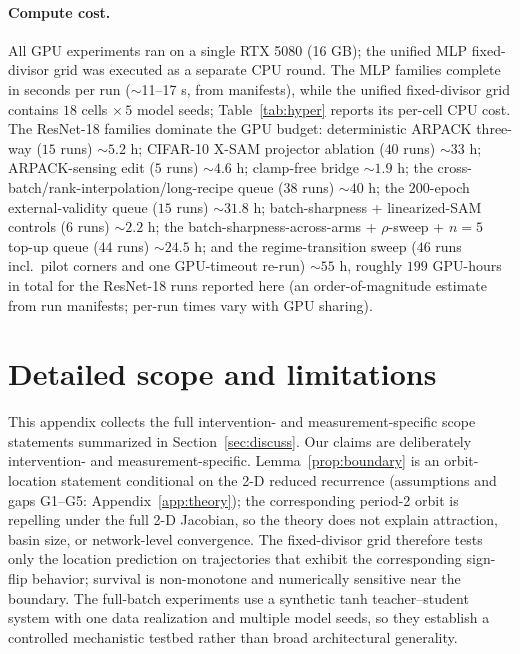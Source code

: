 \documentclass{article}
\theoremstyle{plain}
\theoremstyle{definition}
\theoremstyle{remark}
\begin{document}
\paragraph{Compute cost.} All GPU experiments ran on a single RTX 5080 (16 GB);
the unified MLP fixed-divisor grid was executed as a separate CPU round.
The MLP families complete in seconds per run ($\sim$11--17 s, from
manifests), while the unified fixed-divisor grid contains $18$ cells
$\times\,5$ model seeds; Table~\ref{tab:hyper} reports its per-cell CPU
cost. The ResNet-18 families dominate the GPU budget: deterministic ARPACK three-way
($15$ runs) ${\sim}5.2$ h; CIFAR-10 X-SAM projector ablation ($40$ runs) ${\sim}33$ h;
ARPACK-sensing edit ($5$ runs) ${\sim}4.6$ h; clamp-free bridge
${\sim}1.9$ h; the cross-batch/rank-interpolation/long-recipe queue ($38$
runs) ${\sim}40$ h; the $200$-epoch external-validity queue ($15$ runs)
${\sim}31.8$ h; batch-sharpness + linearized-SAM controls ($6$ runs)
${\sim}2.2$ h; the batch-sharpness-across-arms + $\rho$-sweep + $n{=}5$
top-up queue ($44$ runs) ${\sim}24.5$ h; and the regime-transition sweep
($46$ runs incl.\ pilot corners and one GPU-timeout re-run) ${\sim}55$
h, roughly $199$ GPU-hours in
total for the ResNet-18 runs reported here (an order-of-magnitude estimate
from run manifests; per-run times vary with GPU sharing).

\FloatBarrier

\section{Detailed scope and limitations}
\label{app:limits}
This appendix collects the full intervention- and
measurement-specific scope statements summarized in
Section~\ref{sec:discuss}. Our claims are deliberately intervention-
and measurement-specific. Lemma~\ref{prop:boundary} is an
orbit-location statement conditional on the 2-D reduced recurrence
(assumptions and gaps G1--G5: Appendix~\ref{app:theory}); the
corresponding period-2 orbit is repelling under the full 2-D
Jacobian, so the theory does not explain attraction, basin size, or
network-level convergence. The fixed-divisor grid therefore tests
only the location prediction on trajectories that exhibit the
corresponding sign-flip behavior; survival is non-monotone and
numerically sensitive near the boundary. The full-batch experiments
use a synthetic tanh teacher--student system with one data
realization and multiple model seeds, so they establish a controlled
mechanistic testbed rather than broad architectural generality.
\end{document}
